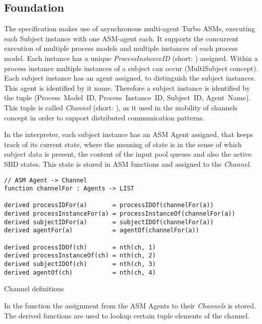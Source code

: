 \subsection{Foundation}

The specification makes use of asynchronous multi-agent Turbo ASMs, executing each Subject instance with one ASM-agent each.
It supports the concurrent execution of multiple process models and multiple instances of each process model.
Each instance has a unique \textit{ProcessInstanceID} (short: ) assigned.
Within a process instance multiple instances of a subject can occur (MultiSubject concept).
Each subject instance has an agent assigned, to distinguish the subject instances.
This agent is identified by it name.
Therefore a subject instance is identified by the tuple (Process~Model~ID, Process~Instance~ID, Subject~ID, Agent~Name).
This tuple is called \textit{Channel} (short: ), as it used in the mobility of channels concept in order to support distributed communication patterns.

In the interpreter, each subject instance has an ASM Agent assigned, that keeps track of its current state,
where the meaning of state is in the sense of which subject data is present, the content of the input pool queues and also the active SBD states.
This state is stored in ASM functions and assigned to the \textit{Channel}.

\begin{listing}[htbp]
\begin{verbatim}
// ASM Agent -> Channel
function channelFor : Agents -> LIST

derived processIDFor(a)       = processIDOf(channelFor(a))
derived processInstanceFor(a) = processInstanceOf(channelFor(a))
derived subjectIDFor(a)       = subjectIDOf(channelFor(a))
derived agentFor(a)           = agentOf(channelFor(a))

derived processIDOf(ch)       = nth(ch, 1)
derived processInstanceOf(ch) = nth(ch, 2)
derived subjectIDOf(ch)       = nth(ch, 3)
derived agentOf(ch)           = nth(ch, 4)
\end{verbatim}
\caption{Channel definitions}
\label{lst:shortasm:channelFor}
\end{listing}

In the function  the assignment from the ASM Agents to their \textit{Channels} is stored.
The derived functions are used to lookup certain tuple elements of the channel.\\

